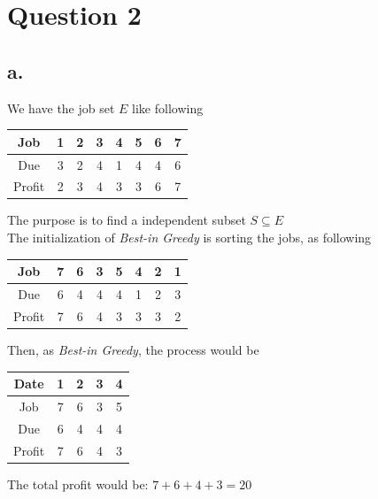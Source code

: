 \documentclass{article}
\begin{document}
\section*{Question 2}{
    \subsection*{a.}{
        We have the job set \(\mathit{E}\) like following
        \begin{center}{
            \begin{tabular}{|c|c|c|c|c|c|c|c|}
            \hline
            Job & 1 & 2 & 3 & 4 & 5 & 6 & 7 \\
            \hline
            Due & 3 & 2 & 4 & 1 & 4 & 4 & 6 \\
            \hline
            Profit & 2 & 3 & 4 & 3 & 3 & 6 & 7 \\
            \hline
            \end{tabular}
        }
        \end{center} 
        The purpose is to find a independent subset \(\mathit{S} \subseteq \mathit{E}\)\\
        The initialization of \textit{Best-in Greedy} is sorting the jobs, as following
        \begin{center}{
            \begin{tabular}{|c|c|c|c|c|c|c|c|}
            \hline
            Job & 7 & 6 & 3 & 5 & 4 & 2 & 1 \\
            \hline
            Due & 6 & 4 & 4 & 4 & 1 & 2 & 3 \\
            \hline
            Profit & 7 & 6 & 4 & 3 & 3 & 3 & 2 \\
            \hline
            \end{tabular}
        }
        \end{center} 
        Then, as \textit{Best-in Greedy}, the process would be
        \begin{center}{
            \begin{tabular}{|c|c|c|c|c|}
            \hline
            Date & 1 & 2 & 3 & 4 \\
            \hline
            Job & 7 & 6 & 3 & 5 \\
            \hline
            Due & 6 & 4 & 4 & 4 \\
            \hline
            Profit & 7 & 6 & 4 & 3 \\
            \hline
            \end{tabular}
        }
        \end{center}
        The total profit would be: \(\mathrm{7+6+4+3=20}\)
    }
}
\end{document}
